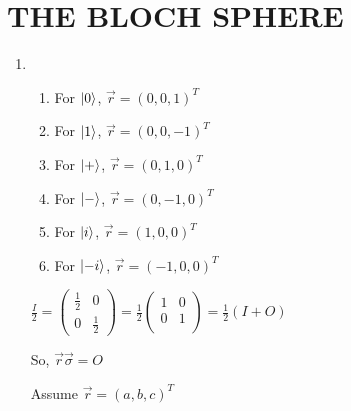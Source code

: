 \documentclass{article}
\begin{document}
\section*{THE BLOCH SPHERE}
\begin{enumerate}
    \item \begin{enumerate}
              \item For $\ket{0}$, $\vec{r}=(0,0,1)^T$
              \item For $\ket{1}$, $\vec{r}=(0,0,-1)^T$
              \item For $\ket{+}$, $\vec{r}=(0,1,0)^T$
              \item For $\ket{-}$, $\vec{r}=(0,-1,0)^T$
              \item For $\ket{i}$, $\vec{r}=(1,0,0)^T$
              \item For $\ket{-i}$, $\vec{r}=(-1,0,0)^T$
          \end{enumerate}
          $\frac{I}{2}=
              \left(
              \begin{array}{cc}
                      \frac{1}{2} & 0 \\0&\frac{1}{2}
                  \end{array}
              \right)
              =\frac{1}{2}\left(
              \begin{array}{cc}
                      1 & 0 \\0&1\\
                  \end{array}
              \right)
              =\frac{1}{2}(I+O)
          $

          So, $\vec{r}\vec{\sigma}=O$

          Assume $\vec{r}=(a,b,c)^T$


\end{enumerate}
\end{document}
